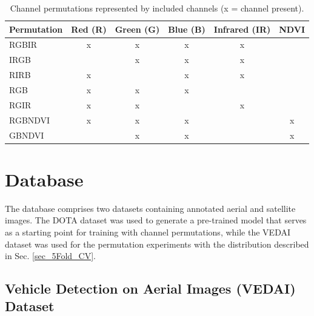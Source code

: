 \begin{table}[h!]
\centering
\begin{tabular}{l|c|c|c|c|c}
\textbf{Permutation} & \textbf{Red (R)} & \textbf{Green (G)} & \textbf{Blue (B)} & \textbf{Infrared (IR)} & \textbf{NDVI} \\
\hline
\acrshort{RGBIR}    & x & x & x & x &   \\
\acrshort{IRGB}     &   & x & x & x &   \\
\acrshort{RIRB}     & x &   & x & x &   \\
\acrshort{RGB}      & x & x & x &   &   \\
\acrshort{RGIR}     & x & x &   & x &   \\
\acrshort{RGBNDVI}  & x & x & x &   & x \\
\acrshort{GBNDVI}   &   & x & x &   & x \\
\end{tabular}
\caption{Channel permutations represented by included channels (x = channel present).}
\label{tab:perm}
\end{table}

\section{Database}
The database comprises two datasets containing annotated aerial and satellite images. The \acrshort{DOTA} dataset was used to generate a pre-trained model that serves as a starting point for training with channel permutations, while the \acrshort{VEDAI} dataset was used for the permutation experiments with the distribution described in Sec. \ref{sec_5Fold_CV}.
\subsection{Vehicle Detection on Aerial Images (VEDAI) Dataset}
\label{subsec:VEDAI}

